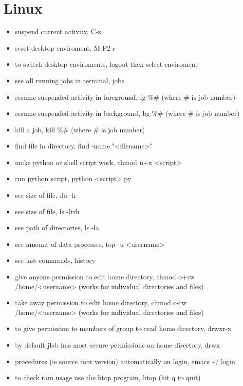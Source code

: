 \documentclass[11pt]{article}
\begin{document}
\section{Linux}
\label{sec:orgaf80f18}
\begin{itemize}
\item suspend current activity, C-z
\item reset desktop enviroment, M-F2 r
\item to switch desktop enviroments, logout then select enviroment
\item see all running jobs in terminal, jobs
\item resume suspended activity in foreground, fg \%\# (where \# is job number)
\item resume suspended activity in background, bg \%\# (where \# is job number)
\item kill a job, kill \%\# (where \# is job number)
\item find file in directory, find -name "<filename>"
\item make python or shell script work, chmod u+x <script>
\item run python script, python <script>.py
\item see size of file, du -h
\item see size of file, ls -ltrh
\item see path of directories, ls -la
\item see amount of data processes, top -u <username>
\item see last commands, history
\item give anyone permission to edit home directory, chmod o+rw /home/<username> (works for individual directories and files)
\item take away permission to edit home directory, chmod o-rw /home/<username> (works for individual directories and files)
\item to give permission to members of group to read home directory, drwxr-x
\item by default jlab has most secure permissions on home directory, drwx
\item procedures (ie source root version) automatically on login, emacs \textasciitilde{}/.login
\item to check ram usage use the htop program, htop (hit q to quit)
\end{itemize}
\end{document}
